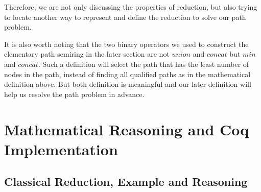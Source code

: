 \documentclass[a4paper,12pt,twoside,openright]{report}
\begin{document}
Therefore, we are not only discussing the properties of reduction, but also trying to locate another way to represent and define the reduction to solve our path problem.

It is also worth noting that the two binary operators we used to construct the elementary path semiring in the later section are not $union$ and $concat$ but $min$ and $concat$. 
Such a definition will select the path that has the least number of nodes in the path, instead of finding all qualified paths as in the mathematical definition above. But both definition is meaningful and our later definition will help us resolve the path problem in advance.


%
%
%

\chapter{Mathematical Reasoning and Coq Implementation} 


\section{Classical Reduction, Example and Reasoning}
\end{document}
